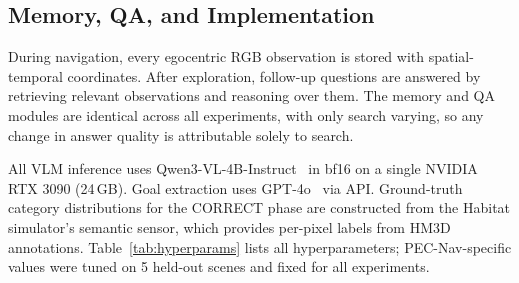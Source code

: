 \subsection{Memory, QA, and Implementation}
\label{sec:memory}

During navigation, every egocentric RGB observation is stored with spatial-temporal coordinates. After exploration, follow-up questions are answered by retrieving relevant observations and reasoning over them. The memory and QA modules are identical across all experiments, with only search varying, so any change in answer quality is attributable solely to search.

All VLM inference uses Qwen3-VL-4B-Instruct~\cite{bai2025qwen3} in bf16 on a single NVIDIA RTX 3090 (24\,GB). Goal extraction uses GPT-4o~\cite{openai2024gpt4o} via API. Ground-truth category distributions for the CORRECT phase are constructed from the Habitat simulator's semantic sensor, which provides per-pixel labels from HM3D annotations. Table~\ref{tab:hyperparams} lists all hyperparameters; PEC-Nav-specific values were tuned on 5 held-out scenes and fixed for all experiments.

\begin{table}[H]
\centering
\caption{PEC-Nav hyperparameters. $\dagger$: inherited from base system.}
\label{tab:hyperparams}
\vspace{1mm}
\end{table}
